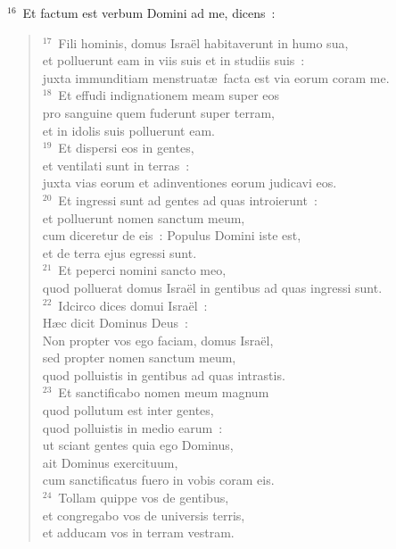 ${}^{16}$~Et factum est verbum Domini ad me, dicens~:
\begin{flushleft}\begin{verse}${}^{17}$~Fili hominis, domus Isra\"el habitaverunt in humo sua,\\ et polluerunt eam in viis suis et in studiis suis~:\\ juxta immunditiam menstruat\ae\ facta est via eorum coram me.\\
${}^{18}$~Et effudi indignationem meam super eos\\ pro sanguine quem fuderunt super terram,\\ et in idolis suis polluerunt eam.\\
${}^{19}$~Et dispersi eos in gentes,\\ et ventilati sunt in terras~:\\ juxta vias eorum et adinventiones eorum judicavi eos.\\
${}^{20}$~Et ingressi sunt ad gentes ad quas introierunt~:\\ et polluerunt nomen sanctum meum,\\ cum diceretur de eis~: Populus Domini iste est,\\ et de terra ejus egressi sunt.\\
${}^{21}$~Et peperci nomini sancto meo,\\ quod polluerat domus Isra\"el in gentibus ad quas ingressi sunt.\\
${}^{22}$~Idcirco dices domui Isra\"el~:\\ H\ae c dicit Dominus Deus~:\\ Non propter vos ego faciam, domus Isra\"el,\\ sed propter nomen sanctum meum,\\ quod polluistis in gentibus ad quas intrastis.\\
${}^{23}$~Et sanctificabo nomen meum magnum\\ quod pollutum est inter gentes,\\ quod polluistis in medio earum~:\\ ut sciant gentes quia ego Dominus,\\ ait Dominus exercituum,\\ cum sanctificatus fuero in vobis coram eis.\\
${}^{24}$~Tollam quippe vos de gentibus,\\ et congregabo vos de universis terris,\\ et adducam vos in terram vestram.\\

\end{verse}
\end{flushleft}
